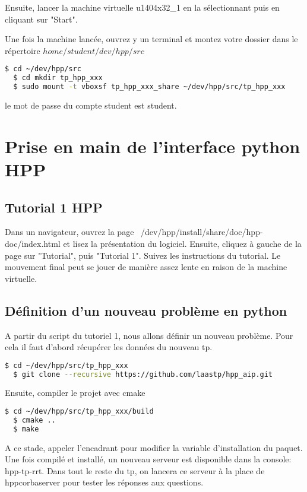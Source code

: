 \documentclass {article}
\begin{document}
Ensuite, lancer la machine virtuelle u1404x32\_1 en la s\'electionnant puis en cliquant sur "Start".

Une fois la machine lanc\'ee, ouvrez y un terminal et montez votre dossier dans le r\'epertoire $home/student/dev/hpp/src$

\begin{lstlisting}[language=bash]
  $ cd ~/dev/hpp/src
  $ cd mkdir tp_hpp_xxx
  $ sudo mount -t vboxsf tp_hpp_xxx_share ~/dev/hpp/src/tp_hpp_xxx 
\end{lstlisting}
le mot de passe du compte student est student.

\section {Prise en main de l'interface python HPP}
\subsection{Tutorial 1 HPP}
Dans un navigateur, ouvrez la page ~/dev/hpp/install/share/doc/hpp-doc/index.html et lisez la pr\'esentation du logiciel.
Ensuite, cliquez \`a gauche de la page sur "Tutorial", puis "Tutorial 1".
Suivez les instructions du tutorial.
Le mouvement final peut se jouer de mani\`ere assez lente en raison de la machine virtuelle.

\subsection{D\'efinition d'un nouveau probl\`eme en python}
A partir du script du tutoriel 1, nous allons d\'efinir un nouveau probl\`eme.
Pour cela il faut d'abord r\'ecup\'erer les donn\'ees du nouveau tp.
\begin{lstlisting}[language=bash]
  $ cd ~/dev/hpp/src/tp_hpp_xxx
  $ git clone --recursive https://github.com/laastp/hpp_aip.git
\end{lstlisting}
Ensuite, compiler le projet avec cmake
\begin{lstlisting}[language=bash]
  $ cd ~/dev/hpp/src/tp_hpp_xxx/build
  $ cmake ..
  $ make
\end{lstlisting}

A ce stade, appeler l'encadrant pour modifier la variable d'installation
du paquet.
Une fois compil\'e et install\'e, un nouveau serveur est disponible dans la console:
hpp-tp-rrt. Dans tout le reste du tp, on lancera ce serveur \`a la place de hppcorbaserver
pour tester les r\'eponses aux questions.
\end{document}
